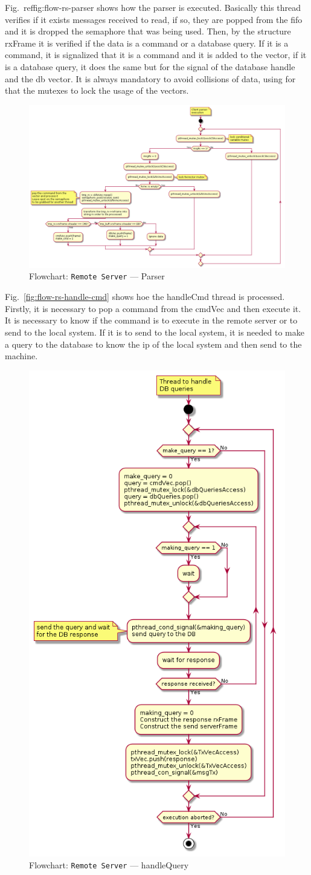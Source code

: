 Fig.~ref{fig:flow-rs-parser} shows how the parser is executed.
Basically this thread verifies if it exists messages received to read, if so, they are popped from the \gls{fifo} and it is dropped the semaphore that was being used.
Then, by the structure rxFrame it is verified if the data is a command or a database query. If it is a command, it is signalized that it is a command and it is added to the vector, if it is a database query, it does the same but for the signal of the database handle and the db vector.
It is always mandatory to avoid collisions of data, using for that the mutexes to lock the usage of the vectors.
%
\begin{figure}[htb!]
\centering
    \includegraphics[width=0.8\columnwidth]{./img/flow-rs-parser.png}
  \caption{Flowchart: \texttt{Remote Server} --- Parser}%
\label{fig:flow-rs-parser}
\end{figure}

Fig.~\ref{fig:flow-rs-handle-cmd} shows hoe the handleCmd thread is processed.
Firstly, it is necessary to pop a command from the cmdVec and then execute it.
It is necessary to know if the command is to execute in the remote server or to send to the local system. If it is to send to the local system, it is needed to make a query to the database to know the ip of the local system and then send to the machine. 
%
\begin{figure}[htb!]
\centering
    \includegraphics[width=0.4\columnwidth]{./img/flow-rs-handle-query.png}
  \caption{Flowchart: \texttt{Remote Server} --- handleQuery}%
\label{fig:flow-rs-handle-query}
\end{figure}

